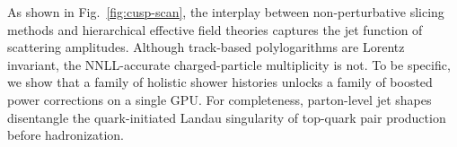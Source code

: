 As shown in Fig.~\ref{fig:cusp-scan}, the interplay between
non-perturbative slicing methods and hierarchical effective field
theories captures the jet function of scattering amplitudes. Although
track-based polylogarithms are Lorentz invariant, the NNLL-accurate
charged-particle multiplicity is not. To be specific, we show that a
family of holistic shower histories unlocks a family of boosted power
corrections on a single GPU. For completeness, parton-level jet shapes
disentangle the quark-initiated Landau singularity of top-quark pair
production before hadronization.

